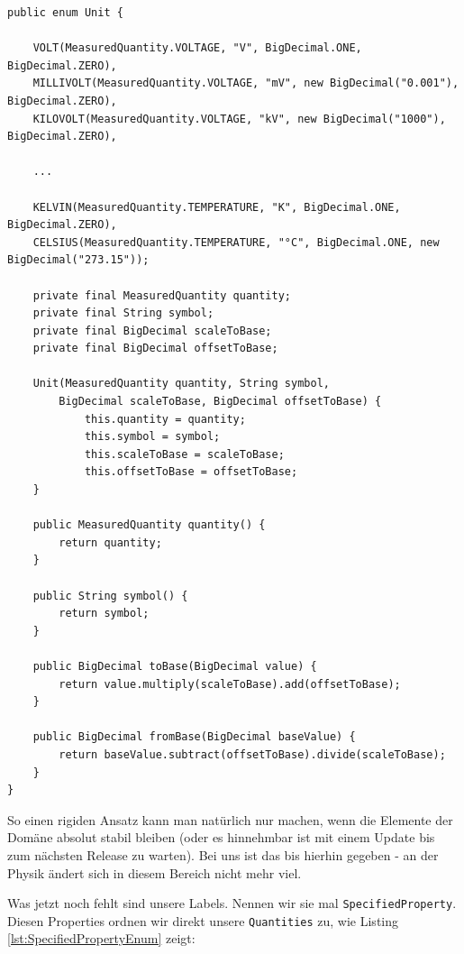 \begin{listing}[H]
\begin{verbatim}
public enum Unit {

    VOLT(MeasuredQuantity.VOLTAGE, "V", BigDecimal.ONE, BigDecimal.ZERO),
    MILLIVOLT(MeasuredQuantity.VOLTAGE, "mV", new BigDecimal("0.001"), BigDecimal.ZERO),
    KILOVOLT(MeasuredQuantity.VOLTAGE, "kV", new BigDecimal("1000"), BigDecimal.ZERO),
    
    ...

    KELVIN(MeasuredQuantity.TEMPERATURE, "K", BigDecimal.ONE, BigDecimal.ZERO),
    CELSIUS(MeasuredQuantity.TEMPERATURE, "°C", BigDecimal.ONE, new BigDecimal("273.15"));

    private final MeasuredQuantity quantity;
    private final String symbol;
    private final BigDecimal scaleToBase;
    private final BigDecimal offsetToBase;

    Unit(MeasuredQuantity quantity, String symbol, 
        BigDecimal scaleToBase, BigDecimal offsetToBase) {
            this.quantity = quantity;
            this.symbol = symbol;
            this.scaleToBase = scaleToBase;
            this.offsetToBase = offsetToBase;
    }

    public MeasuredQuantity quantity() {
        return quantity;
    }

    public String symbol() {
        return symbol;
    }

    public BigDecimal toBase(BigDecimal value) {
        return value.multiply(scaleToBase).add(offsetToBase);
    }

    public BigDecimal fromBase(BigDecimal baseValue) {
        return baseValue.subtract(offsetToBase).divide(scaleToBase);
    }
}
\end{verbatim}
\caption{Gekürzt dargestelltes Unit-enum inkl. Umrechnung in Basiseinheiten}
\label{lst:untiEnum}
\end{listing}

So einen rigiden Ansatz kann man natürlich nur machen, wenn die Elemente der
Domäne absolut stabil bleiben (oder es hinnehmbar ist mit einem Update bis
zum nächsten Release zu warten). Bei uns ist das bis hierhin gegeben - an der
Physik ändert sich in diesem Bereich nicht mehr viel.

Was jetzt noch fehlt sind unsere Labels. Nennen wir sie mal 
\texttt{SpecifiedProperty}. Diesen Properties ordnen wir direkt unsere 
\texttt{Quantities} zu, wie Listing \ref{lst:SpecifiedPropertyEnum} zeigt:

